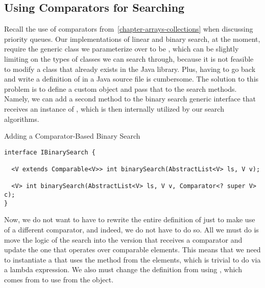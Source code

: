 \subsection*{Using Comparators for Searching}
Recall the use of comparators from~\ref{chapter-arrays-collections} when discussing priority queues. Our implementations of linear and binary search, at the moment, require the generic class we parameterize over to be , which can be slightly limiting on the types of classes we can search through, because it is not feasible to modify a class that already exists in the Java library. Plus, having to go back and write a definition of  in a Java source file is cumbersome. The solution to this problem is to define a custom  object and pass that to the search methods. Namely, we can add a second method to the binary search generic interface that receives an instance of , which is then internally utilized by our search algorithms. 


\begin{cl}{Adding a Comparator-Based Binary Search}
\begin{lstlisting}[language=MyJava]
interface IBinarySearch {

  <V extends Comparable<V>> int binarySearch(AbstractList<V> ls, V v);

  <V> int binarySearch(AbstractList<V> ls, V v, Comparator<? super V> c);
}
\end{lstlisting}
\end{cl}

Now, we do not want to have to rewrite the entire definition of  just to make use of a different comparator, and indeed, we do not have to do so. All we must do is move the logic of the search into the version that receives a comparator and update the one that operates over comparable elements. This means that we need to instantiate a  that uses the  method from the elements, which is trivial to do via a lambda expression. We also must change the definition from using , which comes from  to use  from the  object.

